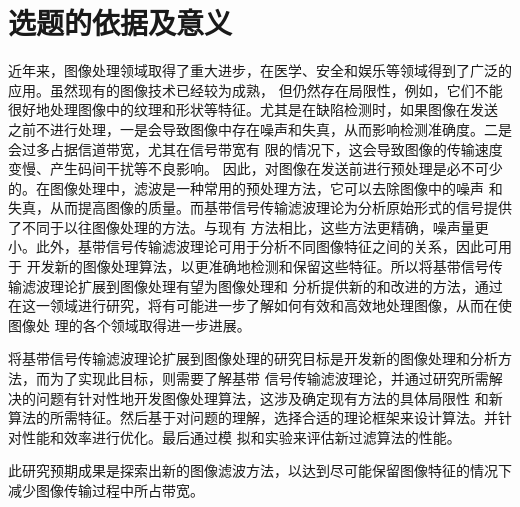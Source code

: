 %
%
%
%

\section{选题的依据及意义}

近年来，图像处理领域取得了重大进步，在医学、安全和娱乐等领域得到了广泛的应用。虽然现有的图像技术已经较为成熟，
但仍然存在局限性，例如，它们不能很好地处理图像中的纹理和形状等特征。尤其是在缺陷检测时，如果图像在发送
之前不进行处理，一是会导致图像中存在噪声和失真，从而影响检测准确度。二是会过多占据信道带宽，尤其在信号带宽有
限的情况下，这会导致图像的传输速度变慢、产生码间干扰等不良影响。
因此，对图像在发送前进行预处理是必不可少的。在图像处理中，滤波是一种常用的预处理方法，它可以去除图像中的噪声
和失真，从而提高图像的质量。而基带信号传输滤波理论为分析原始形式的信号提供了不同于以往图像处理的方法。与现有
方法相比，这些方法更精确，噪声量更小。此外，基带信号传输滤波理论可用于分析不同图像特征之间的关系，因此可用于
开发新的图像处理算法，以更准确地检测和保留这些特征。所以将基带信号传输滤波理论扩展到图像处理有望为图像处理和
分析提供新的和改进的方法，通过在这一领域进行研究，将有可能进一步了解如何有效和高效地处理图像，从而在使图像处
理的各个领域取得进一步进展。

将基带信号传输滤波理论扩展到图像处理的研究目标是开发新的图像处理和分析方法，而为了实现此目标，则需要了解基带
信号传输滤波理论，并通过研究所需解决的问题有针对性地开发图像处理算法，这涉及确定现有方法的具体局限性
和新算法的所需特征。然后基于对问题的理解，选择合适的理论框架来设计算法。并针对性能和效率进行优化。最后通过模
拟和实验来评估新过滤算法的性能。

此研究预期成果是探索出新的图像滤波方法，以达到尽可能保留图像特征的情况下减少图像传输过程中所占带宽。






